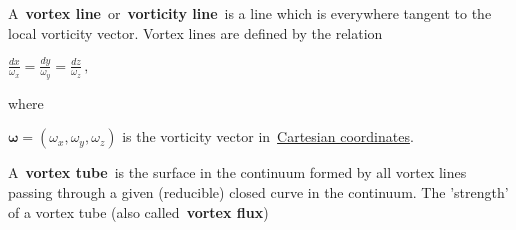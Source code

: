\usepackage{hyperref}
A \textbf{vortex line} or \textbf{vorticity line} is a line which is everywhere tangent to the local vorticity vector. Vortex lines are defined by the relation


${\displaystyle {\frac {dx}{\omega _{x}}}={\frac {dy}{\omega _{y}}}={\frac {dz}{\omega _{z}}}\,,}$

where

${\displaystyle {\boldsymbol {\omega }}=(\omega _{x},\omega _{y},\omega _{z})}$
is the vorticity vector in \href{https://en.wikipedia.org/wiki/Cartesian_coordinates}{Cartesian coordinates}.


A \textbf{vortex tube} is the surface in the continuum formed by all vortex lines passing through a given (reducible) closed curve in the continuum. The 'strength' of a vortex tube (also called \textbf{vortex flux})

